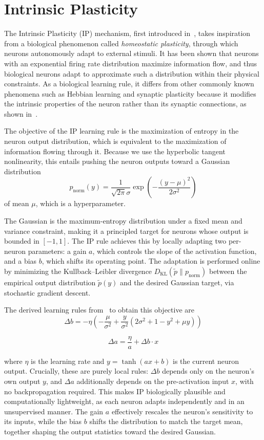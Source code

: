 \documentclass{sapthesis}
\begin{document}
\section{Intrinsic Plasticity}
\label{sec:ip}
The Intrinsic Plasticity (IP) mechanism, first introduced in~\cite{10.1007/11550822_11}, takes inspiration from a biological phenomenon called \textit{homeostatic plasticity}, through which neurons autonomously adapt to external stimuli. It has been shown that neurons with an exponential firing rate distribution maximize information flow, and thus biological neurons adapt to approximate such a distribution within their physical constraints.
As a biological learning rule, it differs from other commonly known phenomena such as Hebbian learning and synaptic plasticity because it modifies the intrinsic properties of the neuron rather than its synaptic connections, as shown in~\cite{destexhe2004plasticity}.

The objective of the IP learning rule is the maximization of entropy in the neuron output distribution, which is equivalent to the maximization of information flowing through it. Because we use the hyperbolic tangent nonlinearity, this entails pushing the neuron outputs toward a Gaussian distribution
\[
  p_{\text{norm}}(y) = \frac{1}{\sqrt{2\pi}\sigma} \exp\left(-\frac{(y-\mu)^2}{2\sigma^2}\right)
\]
of mean $\mu$, which is a hyperparameter.

The Gaussian is the maximum-entropy distribution under a fixed mean and variance constraint, making it a principled target for neurons whose output is bounded in $[-1, 1]$. The IP rule achieves this by locally adapting two per-neuron parameters: a gain $a$, which controls the slope of the activation function, and a bias $b$, which shifts its operating point. The adaptation is performed online by minimizing the Kullback--Leibler divergence $D_{\text{KL}}(\tilde{p} \parallel p_{\text{norm}})$ between the empirical output distribution $\tilde{p}(y)$ and the desired Gaussian target, via stochastic gradient descent.

The derived learning rules from~\cite{10.1016/j.neucom.2007.12.020} to obtain this objective are
\[
  \Delta b = -\eta \left(-\frac{\mu}{\sigma^2} + \frac{y}{\sigma^2}\left(2\sigma^2 + 1 - y^2 + \mu y\right)\right)
\]

\[
  \Delta a = \frac{\eta}{a} + \Delta b \cdot x
\]

where $\eta$ is the learning rate and $y = \tanh(ax + b)$ is the current neuron output. Crucially, these are purely local rules: $\Delta b$ depends only on the neuron's own output $y$, and $\Delta a$ additionally depends on the pre-activation input $x$, with no backpropagation required. This makes IP biologically plausible and computationally lightweight, as each neuron adapts independently and in an unsupervised manner. The gain $a$ effectively rescales the neuron's sensitivity to its inputs, while the bias $b$ shifts the distribution to match the target mean, together shaping the output statistics toward the desired Gaussian.
\end{document}
